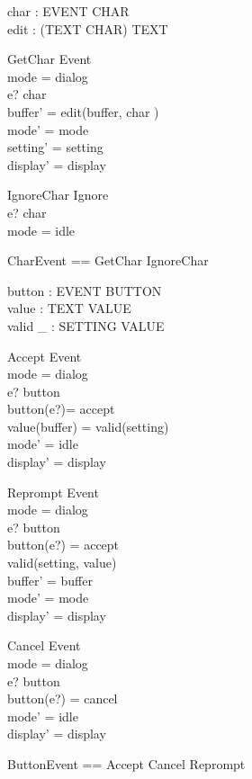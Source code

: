 \documentclass{llncs}
\begin{document}
\begin{axdef}
char : EVENT \pfun CHAR \\
edit : (TEXT \cross CHAR) \fun TEXT
\end{axdef}
\begin{schema}{GetChar}
Event \\
\where mode = dialog \\
e? \in \dom char \\
buffer' = edit(buffer, char ) \\
mode' = mode \\
setting' = setting \\
display' = display
\end{schema}
\begin{schema}{IgnoreChar}
Ignore \\
\where e? \in \dom char \\
mode = idle
\end{schema}
\begin{zed}
CharEvent == GetChar \lor IgnoreChar
\end{zed}

\begin{axdef}
button : EVENT \pfun BUTTON \\
value : TEXT \fun VALUE \\
valid \_ : SETTING \rel VALUE
\end{axdef}
\begin{schema}{Accept}
Event \\
\where mode = dialog \\
e? \in \dom button \\
button(e?)= accept \\
value(buffer) = valid(setting)\\
mode' = idle \\
display' = display
\end{schema}
\begin{schema}{Reprompt}
Event \\
\where mode = dialog \\
e? \in \dom button \\
button(e?) = accept \\
\lnot valid(setting, value)\\
buffer' = buffer \\
mode' = mode \\
display' = display
\end{schema}
\begin{schema}{Cancel}
Event \\
\where mode = dialog \\
e? \in \dom button \\
button(e?) = cancel \\
mode' = idle \\
display' = display
\end{schema}
\begin{zed}
ButtonEvent == Accept \lor Cancel \lor Reprompt
\end{zed}
\end{document}
